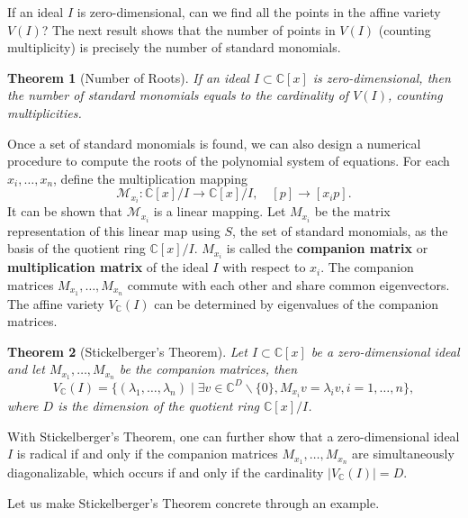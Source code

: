 \documentclass[
]{book}
\newtheorem{theorem}{Theorem}[chapter]
\theoremstyle{definition}
\theoremstyle{definition}
\theoremstyle{definition}
\theoremstyle{definition}
\theoremstyle{remark}
\begin{document}
If an ideal \(I\) is zero-dimensional, can we find all the points in the affine variety \(V(I)\)? The next result shows that the number of points in \(V(I)\) (counting multiplicity) is precisely the number of standard monomials.

\begin{theorem}[Number of Roots]
\protect\hypertarget{thm:PolySysRoots}{}\label{thm:PolySysRoots}If an ideal \(I \subset \mathbb{C}[x]\) is zero-dimensional, then the number of standard monomials equals to the cardinality of \(V(I)\), counting multiplicities.
\end{theorem}

Once a set of standard monomials is found, we can also design a numerical procedure to compute the roots of the polynomial system of equations. For each \(x_i,\dots,x_n\), define the multiplication mapping
\[
\mathcal{M}_{x_i}: \mathbb{C}[x]/I \rightarrow \mathbb{C}[x]/I, \quad [p] \rightarrow [x_i p].
\]
It can be shown that \(\mathcal{M}_{x_i}\) is a linear mapping. Let \(M_{x_i}\) be the matrix representation of this linear map using \(S\), the set of standard monomials, as the basis of the quotient ring \(\mathbb{C}[x]/I\). \(M_{x_i}\) is called the \textbf{companion matrix} or \textbf{multiplication matrix} of the ideal \(I\) with respect to \(x_i\). The companion matrices \(M_{x_1},\dots,M_{x_n}\) commute with each other and share common eigenvectors. The affine variety \(V_{\mathbb{C}}(I)\) can be determined by eigenvalues of the companion matrices.

\begin{theorem}[Stickelberger's Theorem]
\protect\hypertarget{thm:StickelbergerTheorem}{}\label{thm:StickelbergerTheorem}Let \(I \subset \mathbb{C}[x]\) be a zero-dimensional ideal and let \(M_{x_1},\dots,M_{x_n}\) be the companion matrices, then
\[
V_{\mathbb{C}}(I) = \{ (\lambda_1,\dots,\lambda_n) \mid \exists v \in \mathbb{C}^D \backslash \{0 \}, M_{x_i} v = \lambda_i v, i=1,\dots,n  \},
\]
where \(D\) is the dimension of the quotient ring \(\mathbb{C}[x]/I\).
\end{theorem}

With Stickelberger's Theorem, one can further show that a zero-dimensional ideal \(I\) is radical if and only if the companion matrices \(M_{x_1},\dots,M_{x_n}\) are simultaneously diagonalizable, which occurs if and only if the cardinality \(|V_{\mathbb{C}}(I)| = D\).

Let us make Stickelberger's Theorem concrete through an example.
\end{document}
